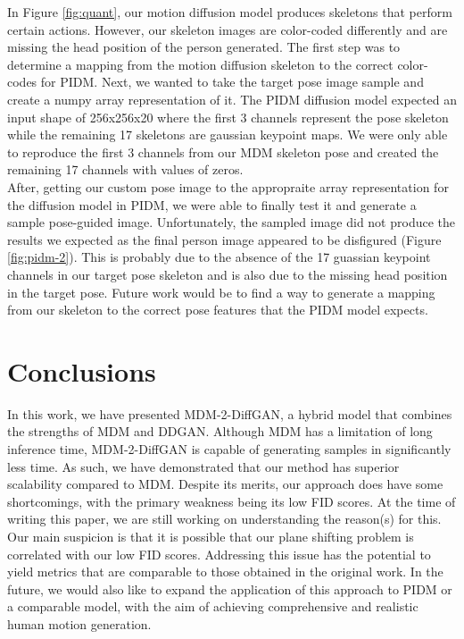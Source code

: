 \documentclass[10pt,twocolumn,letterpaper]{article}
\begin{document}
In Figure \ref{fig:quant}, our motion diffusion model produces skeletons that perform certain actions. 
However, our skeleton images are color-coded differently and are missing the head position of the person 
generated. The first step was to determine a mapping from the motion diffusion skeleton to the correct color-codes 
for PIDM. Next, we wanted to take the target pose image sample and create a numpy array representation of it. The PIDM 
diffusion model expected an input shape of 256x256x20 where the first 3 channels represent the pose skeleton 
while the remaining 17 skeletons are gaussian keypoint maps. We were only able to reproduce the first 3 channels 
from our MDM skeleton pose and created the remaining 17 channels with values of zeros.
\\

After, getting our custom pose image to the appropraite array representation for the diffusion model in PIDM, 
we were able to finally test it and generate a sample pose-guided image. Unfortunately, the sampled image 
did not produce the results we expected as the final person image appeared to be disfigured (Figure \ref{fig:pidm-2}). 
This is probably due to the absence of the 17 guassian keypoint channels in our target pose skeleton and 
is also due to the missing head position in the target pose. Future work would be to find a way to generate
a mapping from our skeleton to the correct pose features that the PIDM model expects.


\section{Conclusions}
\label{sec:conlusions}

In this work, we have presented MDM-2-DiffGAN, a hybrid model that combines the strengths of MDM and DDGAN. Although MDM has a 
limitation of long inference time, MDM-2-DiffGAN is capable of generating samples in significantly less time. As such, we have 
demonstrated that our method has superior scalability compared to MDM. Despite its merits, our approach does have some shortcomings,
with the primary weakness being its low FID scores. At the time of writing this paper, we are still working on understanding the 
reason(s) for this. Our main suspicion is that it is possible that our plane shifting problem is correlated with our low FID scores. 
Addressing this issue has the potential to yield metrics that are comparable to those obtained in the original work. In the future, 
we would also like to expand the application of this approach to PIDM or a comparable model, with the aim of achieving comprehensive 
and realistic human motion generation.

\newpage
{\small


}
\end{document}
